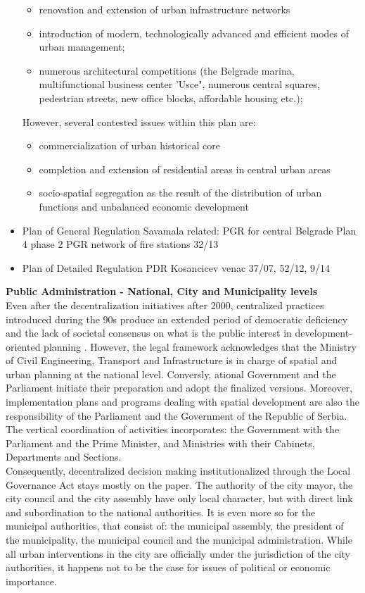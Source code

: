 \documentclass[11pt]{report}
\begin{document}
\begin{itemize}
\begin{itemize}
\item renovation and extension of urban infrastructure networks
\item introduction  of  modern, technologically  advanced  and  efficient  modes  of  urban management;
\item numerous  architectural  competitions (the Belgrade marina, multifunctional business center 'Usce", numerous central squares, pedestrian streets, new office blocks, affordable housing etc.);
\end{itemize}
However, several contested issues within this plan are:
\begin{itemize}
\item commercialization  of  urban  historical core
\item completion and extension of residential  areas in central urban areas
\item socio-spatial segregation as the result of the distribution of urban functions and unbalanced economic development
\end{itemize}
\item Plan of General Regulation
Savamala related: PGR for central Belgrade Plan 4 phase 2 
PGR network of fire stations 32/13
\item Plan of Detailed Regulation
PDR Kosancicev venac 37/07, 52/12, 9/14
\end{itemize}

\textbf{Public Administration - National, City and Municipality levels}
\\
Even after the decentralization initiatives after 2000, centralized practices introduced during the 90s produce an extended period of democratic deficiency and the lack of societal consensus on what is the public interest in development-oriented planning \cite{Vujosevic 2012}.
However, the legal framework acknowledges that the Ministry of Civil Engineering, Transport and Infrastructure is in charge of spatial and urban planning at the national level. Conversly, ational Government and the Parliament initiate their preparation and adopt the finalized versions. Moreover, implementation plans and programs dealing with spatial development are also the responsibility of the Parliament and the Government of the Republic of Serbia. The vertical coordination of activities incorporates: the Government with the Parliament and the Prime Minister, and Ministries with their Cabinets, Departments and Sections\cite{Stojkov and Dobricic 2012 02}.
\\
Consequently, decentralized decision making institutionalized through the Local Governance Act stays mostly on the paper. The authority of the city mayor, the city council and the city assembly have only local character, but with direct link and subordination to the national authorities. It is even more so for the municipal authorities, that consist of: the municipal assembly, the president of the municipality, the municipal council and the municipal administration.  While all urban interventions in the city are officially under the jurisdiction of the city authorities, it happens not to be the case for issues of political or economic importance.
\end{document}
